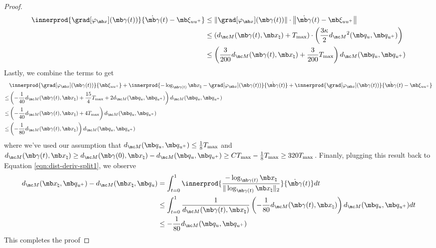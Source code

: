 \begin{proof}
\begin{equation}
\begin{aligned}
    \innerprod{\grad[\varphi_{\mb x}](\mb\gamma(t))}{\dot{\mb\gamma}(t)-\mb\xi_{uu^+}}
    &\leq \left\|\grad[\varphi_{\mb x}](\mb\gamma(t))\right\| \cdot \left\|\dot{\mb\gamma}(t)-\mb\xi_{uu^+}\right\| \\ 
    &\leq \left(d_{\mc M} (\mb\gamma(t), \mb x_\natural) + T_{\max} \right)\cdot\left(\frac{3\kappa}{2}d_{\mc M}{^2}(\mb q_u, \mb q_{u^+})\right)\\
    &\leq \left(\frac{3}{200}d_{\mc M} (\mb\gamma(t), \mb x_\natural) +\frac{3}{200} T_{\max} \right)d_{\mc M}(\mb q_u, \mb q_{u^+})
    \end{aligned}
\end{equation}
Lastly, we combine the terms to get
\begin{equation}
    \begin{aligned}
        & \innerprod{\grad[\varphi_{\mb x}](\mb\gamma(t))}{\mb \xi_{uu^+}}
        + \innerprod{-\log_{\mb \gamma(t)}\mb x_\natural - \grad[\varphi_{\mb x}](\mb\gamma(t))}{\dot{\mb\gamma}(t)}
        + \innerprod{\grad[\varphi_{\mb x}](\mb\gamma(t))}{\dot{\mb\gamma}(t)-\mb\xi_{uu^+}} \\
        \leq& \left(-\frac{1}{40}d_{\mc M} (\mb\gamma(t), \mb x_\natural) +\frac{15}{4}T_{\max}+ 2d_{\mc M}(\mb q_u, \mb q_{u^+}) \right)d_{\mc M}(\mb q_u, \mb q_{u^+})\\
        \leq& \left(-\frac{1}{40}d_{\mc M} (\mb\gamma(t), \mb x_\natural) +4T_{\max}\right)d_{\mc M}(\mb q_u, \mb q_{u^+})\\
        \leq& \left(-\frac{1}{80}d_{\mc M} (\mb\gamma(t), \mb x_\natural)\right)d_{\mc M}(\mb q_u, \mb q_{u^+})
    \end{aligned}
\end{equation}
where we've used our assumption that $d_{\mc M}(\mb q_u, \mb q_{u^+})\leq \frac{1}{8}T_{\max}$ and $d_{\mc M} (\mb\gamma(t), \mb x_\natural) \ge d_{\mc M} (\mb\gamma(0), \mb x_\natural) - d_{\mc M}(\mb q_u, \mb q_{u^+}) \ge C T_{\max} - \frac{1}{8} T_{\max} \ge 320 T_{\max}$. Finanly, plugging this result back to Equation \ref{eqn:dist-deriv-split1}, we observe 
\begin{equation}
    \begin{aligned}
        d_{\mc M}(\mb x_\natural, \mb q_{u^+}) - d_{\mc M}(\mb x_\natural, \mb q_u)
        &= \int_{t=0}^1 \innerprod{\frac{-\log_{\mb \gamma(t)}\mb x_\natural}{\| \log_{\mb \gamma(t)}\mb x_\natural\|_2}}{\dot{\mb\gamma}(t)} dt\\
        & \leq \int_{t=0}^1\frac{1}{d_{\mc M}(\mb\gamma(t), \mb x_\natural)}  \left(-\frac{1}{80}d_{\mc M} (\mb\gamma(t), \mb x_\natural)\right)d_{\mc M}(\mb q_u, \mb q_{u^+}) dt\\
        & \leq -\frac{1}{80}d_{\mc M}(\mb q_u, \mb q_{u^+})
    \end{aligned}
\end{equation}
This completes the proof
\end{proof}


